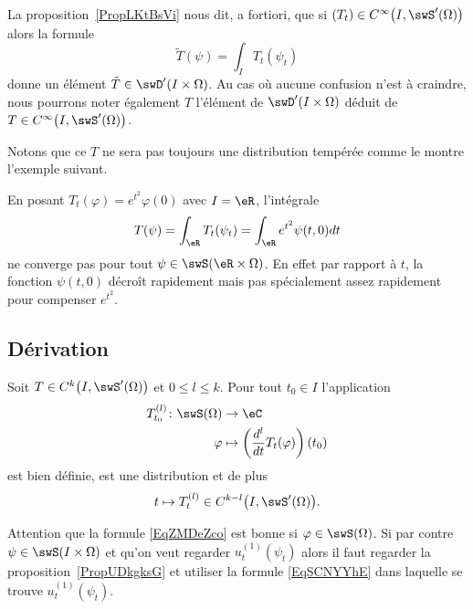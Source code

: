 \begin{remark}  \label{RemZYVkHRT}
    La proposition~\ref{PropLKtBsVi} nous dit, a fortiori, que si \( (T_t)\in C^{\infty}\big( I,\swS'(\Omega) \big)\) alors la formule
    \begin{equation}
        \tilde T(\psi)=\int_IT_t(\psi_t)
    \end{equation}
    donne un élément \( \tilde T\in\swD'(I\times \Omega)\). Au cas où aucune confusion n'est à craindre, nous pourrons noter également \( T\) l'élément de \( \swD'(I\times \Omega)\) déduit de \( T\in C^{\infty}\big( I,\swS'(\Omega) \big)\).
\end{remark}

Notons que ce \( T\) ne sera pas toujours une distribution tempérée comme le montre l'exemple suivant.

\begin{example}
    En posant \( T_t(\varphi)= e^{t^2}\varphi(0)\) avec \( I=\eR\), l'intégrale
    \begin{equation}
        T(\psi)=\int_{\eR}T_t(\psi_t)=\int_{\eR} e^{t^2}\psi(t,0)dt
    \end{equation}
    ne converge pas pour tout \( \psi\in\swS(\eR\times \Omega)\). En effet par rapport à \( t\), la fonction \( \psi(t,0)\) décroît rapidement mais pas spécialement assez rapidement pour compenser \( e^{t^2}\).
\end{example}

\subsection{Dérivation}

\begin{proposition} \label{PropGKoPbko}
    Soit \( T\in C^k\big( I,\swS'(\Omega) \big)\) et \( 0\leq l\leq k\). Pour tout \( t_0\in I\) l'application
    \begin{equation}    \label{EqZMDeZco}
        \begin{aligned}
            T_{t_0}^{(l)}\colon \swS(\Omega)&\to \eC \\
            \varphi&\mapsto \left(\frac{ d^l  }{ dt }T_t(\varphi)\right)(t_0)
        \end{aligned}
    \end{equation}
    est bien définie, est une distribution et de plus
    \begin{equation}
        t\mapsto T_t^{(l)}\in C^{k-l}\big( I,\swS'(\Omega) \big).
    \end{equation}
\end{proposition}
Attention que la formule \eqref{EqZMDeZco} est bonne si \( \varphi\in\swS(\Omega)\). Si par contre \( \psi\in\swS(I\times \Omega)\) et qu'on veut regarder \( u_t^{(1)}(\psi_t)\) alors il faut regarder la proposition~\ref{PropUDkgksG} et utiliser la formule \eqref{EqSCNYYhE} dans laquelle se trouve \( u_t^{(1)}(\psi_t)\).

